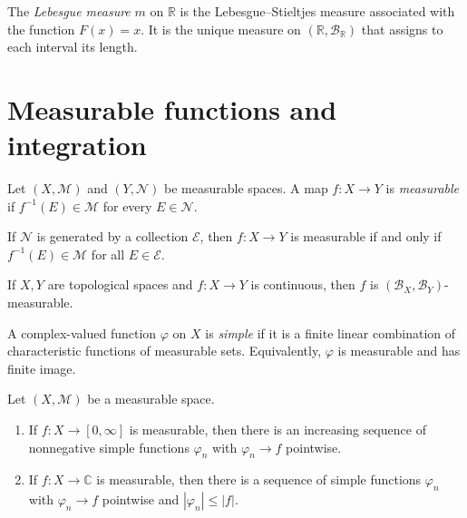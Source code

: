 \begin{example}
\label{example-lebesgue-measure}
The {\it Lebesgue measure} $m$ on
$\mathbb{R}$ is the Lebesgue--Stieltjes
measure associated with the function
$F(x)=x$. It is the unique measure on
$(\mathbb{R}, \mathcal B_{\mathbb{R}})$ that
assigns to each interval its length.
\end{example}

\section
{Measurable functions and integration}
\label{%
section-measurable-functions-integration}

\begin{definition}
\label{definition-measurable-map}
Let $(X,\mathcal M)$ and $(Y,\mathcal N)$ be
measurable spaces. A map $f:X\to Y$ is {\it
measurable} if $f^{-1}(E)\in\mathcal M$ for
every $E\in\mathcal N$.
\end{definition}

\begin{lemma}
\label{lemma-measurable-generated}
If $\mathcal N$ is generated by a collection
$\mathcal E$, then $f:X\to Y$ is measurable
if and only if $f^{-1}(E)\in\mathcal M$ for
all $E\in\mathcal E$.
\end{lemma}

\begin{example}
\label{example-continuous-borel-measurable}
If $X,Y$ are topological spaces and $f:X\to
Y$ is continuous, then $f$ is $(\mathcal
B_X,\mathcal B_Y)$-measurable.
\end{example}

\begin{definition}
\label{definition-simple-function}
A complex-valued function $\varphi$ on $X$ is
{\it simple} if it is a finite linear
combination of characteristic functions of
measurable sets. Equivalently, $\varphi$ is
measurable and has finite image.
\end{definition}

\begin{theorem}
\label{%
theorem-approximation-simple-functions}
Let $(X,\mathcal M)$ be a measurable space.
\begin{enumerate}
\item If $f:X\to[0,\infty]$ is measurable,
then there is an increasing sequence of
nonnegative simple functions $\varphi_n$ with
$\varphi_n\to f$ pointwise.
\item If $f:X\to\mathbb{C}$ is measurable,
then there is a sequence of simple functions
$\varphi_n$ with $\varphi_n\to f$ pointwise
and $|\varphi_n|\leq |f|$.
\end{enumerate}
\end{theorem}


